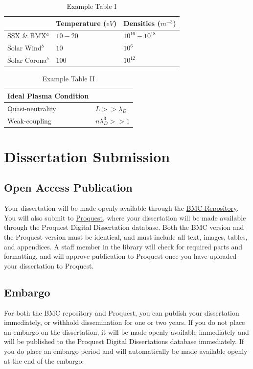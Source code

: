 \documentclass[12pt]{report}
\begin{document}
\begin{table}
    \centering
    \caption{Example Table I}
    \label{tab:plasmas_params_I}
    \small
    \begin{tabularx}{0.75\textwidth}{>{\raggedright\arraybackslash}X>{\raggedright\arraybackslash}X>{\raggedright\arraybackslash}X}
        \hline\hline
        & Temperature ($eV$) & Densities ($m^{-3}$)\\
        \hline
        SSX \& BMX$^a$ &$10-20$ & $10^{16}-10^{18}$\\
        Solar Wind$^{b}$ & $10$ & $10^{6}$ \\
        Solar Corona$^{b}$ & $100$ & $10^{12}$ \\
        \hline\hline 
    \end{tabularx}
\end{table}

\begin{table}
    \centering
    \caption{Example Table II}
    \label{tab:conditions}
    \begin{tabularx}{0.75\textwidth}{>{\raggedright\arraybackslash}X>{\raggedright\arraybackslash}X}
         \hline\hline
         \textbf{Ideal Plasma Condition} &\\
         \hline
         Quasi-neutrality &  $L>>\lambda_{D}$\\
         Weak-coupling & $n\lambda_{D}^3 >> 1$\\
         \hline\hline
    \end{tabularx}
\end{table}

\chapter{Dissertation Submission}
\section{Open Access Publication}
Your dissertation will be made openly available through the \href{https://repository.brynmawr.edu/}{BMC Repository}. You will also submit to \href{https://www.proquest.com/}{Proquest}, where your dissertation will be made available through the Proquest Digital Dissertation database. Both the BMC version and the Proquest version must be identical, and must include all text, images, tables, and appendices. A staff member in the library will check for required parts and formatting, and will approve publication to Proquest once you have uploaded your dissertation to Proquest.
\section{Embargo}
For both the BMC repository and Proquest, you can publish your dissertation immediately, or withhold dissemination for one or two years. If you do not place an embargo on the dissertation, it will be made openly available immediately and will be published to the Proquest Digital Dissertations database immediately. If you do place an embargo period and will automatically be made available openly at the end of the embargo. 
\end{document}
